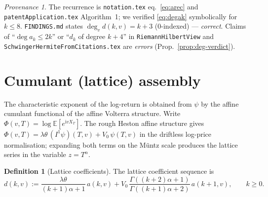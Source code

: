 \documentclass[11pt]{article}
\DeclareMathOperator{\dg}{deg}
\newcommand{\Ii}{\mathrm{i}}
\theoremstyle{plain}
\theoremstyle{definition}
\newtheorem{definition}[theorem]{Definition}
\theoremstyle{remark}
\newtheorem*{provenance}{Provenance}
\begin{document}
\begin{provenance}
The recurrence is \texttt{notation.tex} eq.~\eqref{eq:arec} and
\texttt{patentApplication.tex} Algorithm~1; we verified \eqref{eq:degak}
symbolically for $k\le8$. \texttt{FINDINGS.md} states $\dg_v d(k,v)=k+3$
($0$-indexed) --- \emph{correct}. Claims of ``$\dg a_k\le 2k$'' or
``$d_k$ of degree $k+4$'' in \texttt{RiemannHilbertView} and
\texttt{SchwingerHermiteFromCitations.tex} are \emph{errors} (Prop.~\ref{prop:deg-verdict}).
\end{provenance}

\section{Cumulant (lattice) assembly}
\label{sec:cumulant}

The characteristic exponent of the log-return is obtained from $\psi$ by the
affine cumulant functional of the affine Volterra structure. Write
$\Phi(v,T)=\log \mathbb E[e^{\Ii v X_T}]$. The rough Heston affine structure gives
$\Phi(v,T)=\lambda\theta\,(I^1\psi)(T,v)+V_0\,\psi(T,v)$ in the driftless
log-price normalisation; expanding both terms on the Müntz scale produces the
lattice series in the variable $z=T^\alpha$.

\begin{definition}[Lattice coefficients]\label{def:dk}
The lattice coefficient sequence is
\begin{equation}\label{eq:dk}
   d(k,v):=\frac{\lambda\theta}{(k+1)\alpha+1}\,a(k,v)
   +V_0\,\frac{\Gamma((k+2)\alpha+1)}{\Gamma((k+1)\alpha+2)}\,a(k+1,v),
   \qquad k\ge0 .
\end{equation}
\end{definition}
\end{document}
